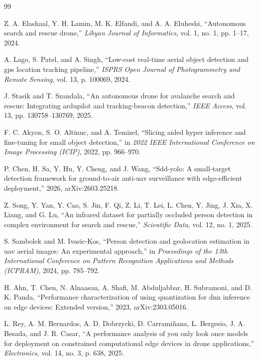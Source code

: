 \documentclass[conference]{IEEEtran}
\begin{document}
\begin{thebibliography}{99}

Z. A. Elashaal, Y. H. Lamin, M. K. Elfandi, and A. A. Eluheshi, ``Autonomous
search and rescue drone,'' \emph{Libyan Journal of Informatics}, vol. 1, no. 1,
pp. 1--17, 2024.

A. Lago, S. Patel, and A. Singh, ``Low-cost real-time aerial object detection
and gps location tracking pipeline,'' \emph{ISPRS Open Journal of Photogrammetry
and Remote Sensing}, vol. 13, p. 100069, 2024.

J. Stasik and T. Szandala, ``An autonomous drone for avalanche search and
rescue: Integrating ardupilot and tracking-beacon detection,'' \emph{IEEE
Access}, vol. 13, pp. 130758--130769, 2025.

F. C. Akyon, S. O. Altinuc, and A. Temizel, ``Slicing aided hyper inference and
fine-tuning for small object detection,'' in \emph{2022 IEEE International
Conference on Image Processing (ICIP)}, 2022, pp. 966--970.

P. Chen, H. Sa, Y. Hu, Y. Cheng, and J. Wang, ``Sdd-yolo: A small-target
detection framework for ground-to-air anti-uav surveillance with edge-efficient
deployment,'' 2026, arXiv:2603.25218.

Z. Song, Y. Yan, Y. Cao, S. Jin, F. Qi, Z. Li, T. Lei, L. Chen, Y. Jing, J. Xia,
X. Liang, and G. Lu, ``An infrared dataset for partially occluded person
detection in complex environment for search and rescue,'' \emph{Scientific
Data}, vol. 12, no. 1, 2025.

S. Sambolek and M. Ivasic-Kos, ``Person detection and geolocation estimation in
uav aerial images: An experimental approach,'' in \emph{Proceedings of the 13th
International Conference on Pattern Recognition Applications and Methods
(ICPRAM)}, 2024, pp. 785--792.

H. Ahn, T. Chen, N. Alnaasan, A. Shafi, M. Abduljabbar, H. Subramoni, and
D. K. Panda, ``Performance characterization of using quantization for dnn
inference on edge devices: Extended version,'' 2023, arXiv:2303.05016.

L. Rey, A. M. Bernardos, A. D. Dobrzycki, D. Carrami\~{n}ana, L. Bergesio,
J. A. Besada, and J. R. Casar, ``A performance analysis of you only look once
models for deployment on constrained computational edge devices in drone
applications,'' \emph{Electronics}, vol. 14, no. 3, p. 638, 2025.


\end{thebibliography}
\end{document}
